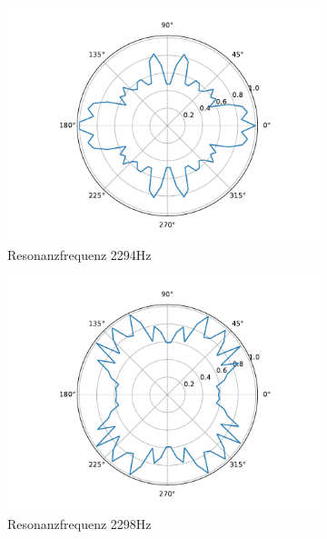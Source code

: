\begin{figure}
    \label{fig:polar3}
    \centering
    \begin{subfigure}[b]{0.3\textwidth}
        \centering
        \includegraphics[width=\textwidth]{pic/polar_max_294.pdf}
        \caption{Resonanzfrequenz 2294Hz}
    \end{subfigure}
    \hfill
    \begin{subfigure}[b]{0.3\textwidth}
        \centering
        \includegraphics[width=\textwidth]{pic/polar_max_298.pdf}
        \caption{Resonanzfrequenz 2298Hz}
    \end{subfigure}
    \hfill
    \begin{subfigure}[b]{0.3\textwidth}
        \centering

\end{subfigure}
\end{figure}
